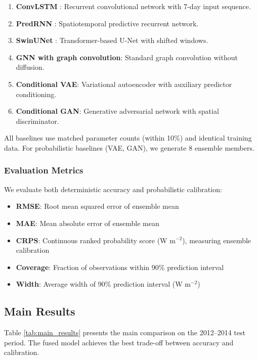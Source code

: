 \documentclass[preprint,12pt]{elsarticle}
\begin{document}
\begin{enumerate}
\item \textbf{ConvLSTM} \cite{shi2015convolutional}: Recurrent convolutional network with 7-day input sequence.
\item \textbf{PredRNN} \cite{wang2017predrnn}: Spatiotemporal predictive recurrent network.
\item \textbf{SwinUNet} \cite{cao2022swin}: Transformer-based U-Net with shifted windows.
\item \textbf{GNN with graph convolution}: Standard graph convolution without diffusion.
\item \textbf{Conditional VAE}: Variational autoencoder with auxiliary predictor conditioning.
\item \textbf{Conditional GAN}: Generative adversarial network with spatial discriminator.
\end{enumerate}

All baselines use matched parameter counts (within 10\%) and identical training data. For probabilistic baselines (VAE, GAN), we generate 8 ensemble members.

\subsubsection{Evaluation Metrics}

We evaluate both deterministic accuracy and probabilistic calibration:

\begin{itemize}
\item \textbf{RMSE}: Root mean squared error of ensemble mean
\item \textbf{MAE}: Mean absolute error of ensemble mean
\item \textbf{CRPS}: Continuous ranked probability score (W m$^{-2}$), measuring ensemble calibration
\item \textbf{Coverage}: Fraction of observations within 90\% prediction interval
\item \textbf{Width}: Average width of 90\% prediction interval (W m$^{-2}$)
\end{itemize}

\subsection{Main Results}

Table \ref{tab:main_results} presents the main comparison on the 2012--2014 test period. The fused model achieves the best trade-off between accuracy and calibration.
\end{document}
